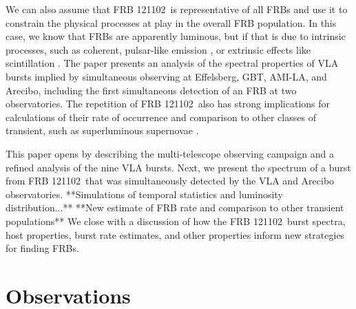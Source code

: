\documentclass[twocolumn]{aastex61}
\newcommand{\frb}{FRB 121102}
\begin{document}
We can also assume that \frb\ is representative of all FRBs and use it to constrain the physical processes at play in the overall FRB population. In this case, we know that FRBs are apparently luminous, but if that is due to intrinsic processes, such as coherent, pulsar-like emission \citep{2014PhRvD..89j3009K, 2014ApJ...785L..26L, 2016MNRAS.457..232C}, or extrinsic effects like scintillation \citep{CORDES}. The paper presents an analysis of the spectral properties of VLA bursts implied by simultaneous observing at Effelsberg, GBT, AMI-LA, and Arecibo, including the first simultaneous detection of an FRB at two observatories. The repetition of \frb\ also has strong implications for calculations of their rate of occurrence \citep{2016MNRAS.458L..89C} and comparison to other classes of transient, such as superluminous supernovae \citep{OPT}.

This paper opens by describing the multi-telescope observing campaign and a refined analysis of the nine VLA bursts. Next, we present the spectrum of a burst from \frb\ that was simultaneously detected by the VLA and Arecibo observatories. **Simulations of temporal statistics and luminosity distribution...** **New estimate of FRB rate and comparison to other transient populations** We close with a discussion of how the \frb\ burst spectra, host properties, burst rate estimates, and other properties inform new strategies for finding FRBs.

\section{Observations}
\end{document}
